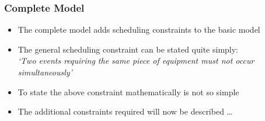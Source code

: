 \documentclass{beamer}
\begin{document}
\begin{frame}
    \frametitle{Complete Model}
    \begin{itemize}
        \item The complete model adds scheduling constraints to the basic
        model
        \item The general scheduling constraint can be stated quite simply:\\
        \emph{`Two events requiring the same piece of equipment must not occur
        simultaneously'}
        \item To state the above constraint mathematically is not so simple
        \item The additional constraints required will now be described
        \ldots
    \end{itemize}
\end{frame}
\end{document}
